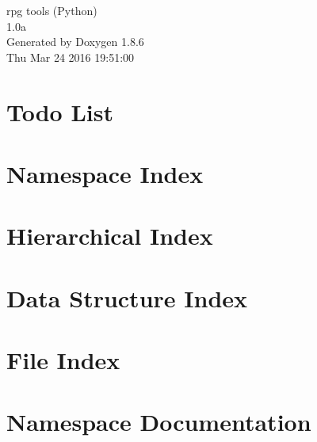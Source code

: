 \documentclass[twoside]{book}
\newcommand{\clearemptydoublepage}{%
  \newpage{\pagestyle{empty}\cleardoublepage}%
}
\begin{document}
\hypersetup{pageanchor=false}
\begin{titlepage}
\vspace*{7cm}
\begin{center}%
{\Large rpg tools (Python) \\[1ex]\large 1.\-0a }\\
\vspace*{1cm}
{\large Generated by Doxygen 1.8.6}\\
\vspace*{0.5cm}
{\small Thu Mar 24 2016 19:51:00}\\
\end{center}
\end{titlepage}
\clearemptydoublepage
\tableofcontents
\clearemptydoublepage
{}
\hypersetup{pageanchor=true}

\chapter{Todo List}
\label{todo}
\hypertarget{todo}{}

\chapter{Namespace Index}

\chapter{Hierarchical Index}

\chapter{Data Structure Index}

\chapter{File Index}

\chapter{Namespace Documentation}








\end{document}
